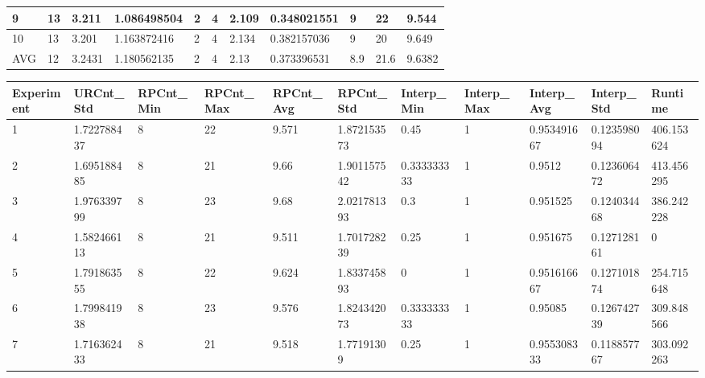 \begin{table}[H]
\begin{adjustbox}{max width=380pt,keepaspectratio,angle=90}
\begin{tabular}{|l|l|l|l|l|l|l|l|l|l|l|}
						9          & 13        & 3.211     & 1.086498504 & 2            & 4            & 2.109        & 0.348021551  & 9          & 22         & 9.544      \\ \hline
						10         & 13        & 3.201     & 1.163872416 & 2            & 4            & 2.134        & 0.382157036  & 9          & 20         & 9.649      \\ \hline\hline
						AVG        & 12        & 3.2431    & 1.180562135 & 2            & 4            & 2.13         & 0.373396531  & 8.9        & 21.6       & 9.6382     \\ \hline
					\end{tabular}	
				\end{adjustbox}
				\begin{adjustbox}{max width=380pt,keepaspectratio,angle=90}
					\begin{tabular}{|l|l|l|l|l|l|l|l|l|l|l|}
						\rowcolor[HTML]{EFEFEF} 
						\hline
						Experiment & URCnt\_Std  & RPCnt\_Min & RPCnt\_Max & RPCnt\_Avg & RPCnt\_Std  & Interp\_Min & Interp\_Max & Interp\_Avg & Interp\_Std & Runtime     \\ \hline
						1          & 1.722788437 & 8          & 22         & 9.571      & 1.872153573 & 0.45        & 1           & 0.953491667 & 0.123598094 & 406.153624  \\ \hline
						2          & 1.695188485 & 8          & 21         & 9.66       & 1.901157542 & 0.333333333 & 1           & 0.9512      & 0.123606472 & 413.456295  \\ \hline
						3          & 1.976339799 & 8          & 23         & 9.68       & 2.021781393 & 0.3         & 1           & 0.951525    & 0.124034468 & 386.242228  \\ \hline
						4          & 1.582466113 & 8          & 21         & 9.511      & 1.701728239 & 0.25        & 1           & 0.951675    & 0.127128161 & 0           \\ \hline
						5          & 1.791863555 & 8          & 22         & 9.624      & 1.833745893 & 0           & 1           & 0.951616667 & 0.127101874 & 254.715648  \\ \hline
						6          & 1.799841938 & 8          & 23         & 9.576      & 1.824342073 & 0.333333333 & 1           & 0.95085     & 0.126742739 & 309.848566  \\ \hline
						7          & 1.716362433 & 8          & 21         & 9.518      & 1.77191309  & 0.25        & 1           & 0.955308333 & 0.118857767 & 303.092263  \\ \hline

\end{tabular}
\end{adjustbox}
\end{table}
